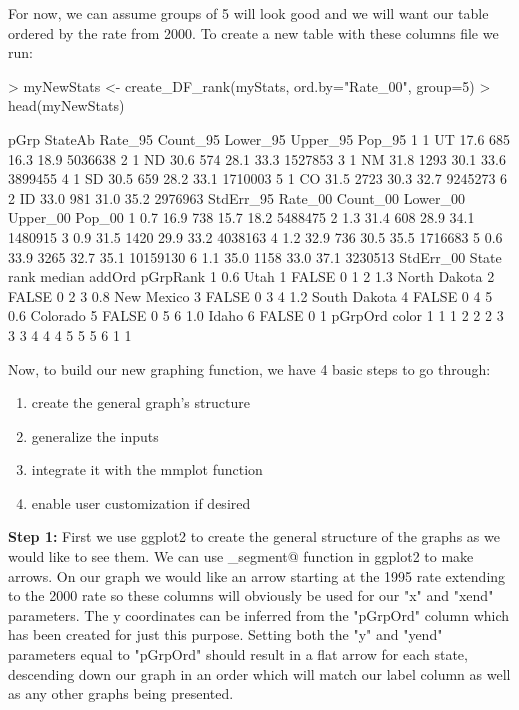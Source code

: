 \documentclass{article}
\begin{document}
For now, we can assume groups of 5 will look good and we will want our table ordered by the rate from 2000. To create a new table with these columns file we run:

\begin{Schunk}
\begin{Sinput}
> myNewStats <- create_DF_rank(myStats, ord.by="Rate_00", group=5)
> head(myNewStats)
\end{Sinput}
\begin{Soutput}
  pGrp StateAb Rate_95 Count_95 Lower_95 Upper_95  Pop_95
1    1      UT    17.6      685     16.3     18.9 5036638
2    1      ND    30.6      574     28.1     33.3 1527853
3    1      NM    31.8     1293     30.1     33.6 3899455
4    1      SD    30.5      659     28.2     33.1 1710003
5    1      CO    31.5     2723     30.3     32.7 9245273
6    2      ID    33.0      981     31.0     35.2 2976963
  StdErr_95 Rate_00 Count_00 Lower_00 Upper_00   Pop_00
1       0.7    16.9      738     15.7     18.2  5488475
2       1.3    31.4      608     28.9     34.1  1480915
3       0.9    31.5     1420     29.9     33.2  4038163
4       1.2    32.9      736     30.5     35.5  1716683
5       0.6    33.9     3265     32.7     35.1 10159130
6       1.1    35.0     1158     33.0     37.1  3230513
  StdErr_00        State rank median addOrd pGrpRank
1       0.6         Utah    1  FALSE      0        1
2       1.3 North Dakota    2  FALSE      0        2
3       0.8   New Mexico    3  FALSE      0        3
4       1.2 South Dakota    4  FALSE      0        4
5       0.6     Colorado    5  FALSE      0        5
6       1.0        Idaho    6  FALSE      0        1
  pGrpOrd color
1       1     1
2       2     2
3       3     3
4       4     4
5       5     5
6       1     1
\end{Soutput}
\end{Schunk}

Now, to build our new graphing function, we have 4 basic steps to go through:
\begin{enumerate}
  \item create the general graph's structure
  \item generalize the inputs
  \item integrate it with the mmplot function
  \item enable user customization if desired
\end{enumerate}

\textbf{Step 1:} First we use ggplot2 to create the general structure of the graphs as we would like to see them. We can use \verb@geom_segment@ function in ggplot2 to make arrows. On our graph we would like an arrow starting at the 1995 rate extending to the 2000 rate so these columns will obviously be used for our "x" and "xend" parameters. The y coordinates can be inferred from the "pGrpOrd" column which has been created for just this purpose. Setting both the "y" and "yend" parameters equal to "pGrpOrd" should result in a flat arrow for each state, descending down our graph in an order which will match our label column as well as any other graphs being presented.
\end{document}
